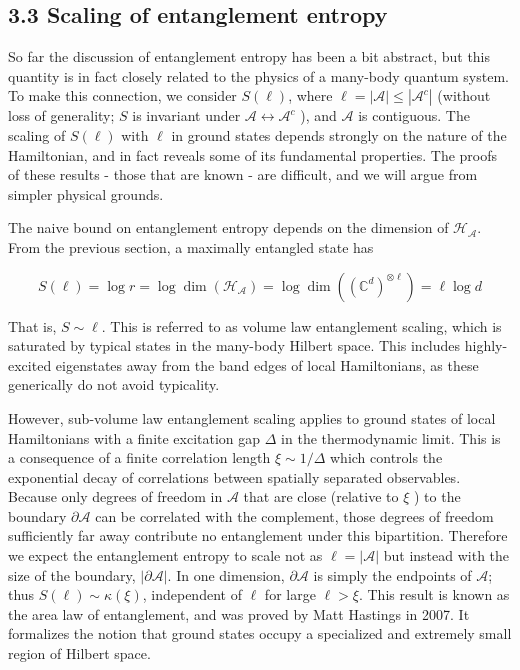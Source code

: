 \documentclass[12pt]{article}
\begin{document}
\subsection*{3.3 Scaling of entanglement entropy}
So far the discussion of entanglement entropy has been a bit abstract, but this quantity is in fact closely related to the physics of a many-body quantum system. To make this connection, we consider $S(\ell)$, where $\ell=|\mathcal{A}| \leq\left|\mathcal{A}^{c}\right|$ (without loss of generality; $S$ is invariant under $\mathcal{A} \leftrightarrow \mathcal{A}^{c}$ ), and $\mathcal{A}$ is contiguous. The scaling of $S(\ell)$ with $\ell$ in ground states depends strongly on the nature of the Hamiltonian, and in fact reveals some of its fundamental properties. The proofs of these results - those that are known - are difficult, and we will argue from simpler physical grounds.

The naive bound on entanglement entropy depends on the dimension of $\mathcal{H}_{\mathcal{A}}$. From the previous section, a maximally entangled state has


\begin{equation*}
S(\ell)=\log r=\log \operatorname{dim}\left(\mathcal{H}_{\mathcal{A}}\right)=\log \operatorname{dim}\left(\left(\mathbb{C}^{d}\right)^{\otimes \ell}\right)=\ell \log d \tag{10}
\end{equation*}


That is, $S \sim \ell$. This is referred to as volume law entanglement scaling, which is saturated by typical states in the many-body Hilbert space. This includes highly-excited eigenstates away from the band edges of local Hamiltonians, as these generically do not avoid typicality.

However, sub-volume law entanglement scaling applies to ground states of local Hamiltonians with a finite excitation gap $\Delta$ in the thermodynamic limit. This is a consequence of a finite correlation length $\xi \sim 1 / \Delta$ which controls the exponential decay of correlations between spatially separated observables. Because only degrees of freedom in $\mathcal{A}$ that are close (relative to $\xi$ ) to the boundary $\partial \mathcal{A}$ can be correlated with the complement, those degrees of freedom sufficiently far away contribute no entanglement under this bipartition. Therefore we expect the entanglement entropy to scale not as $\ell=|\mathcal{A}|$ but instead with the size of the boundary, $|\partial \mathcal{A}|$. In one dimension, $\partial \mathcal{A}$ is simply the endpoints of $\mathcal{A}$; thus $S(\ell) \sim \kappa(\xi)$, independent of $\ell$ for large $\ell>\xi$. This result is known as the area law of entanglement, and was proved by Matt Hastings in 2007. It formalizes the notion that ground states occupy a specialized and extremely small region of Hilbert space.
\end{document}
